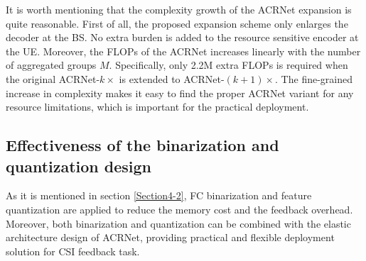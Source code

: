 \documentclass[12pt, draftclsnofoot, onecolumn]{IEEEtran}
\begin{document}
It is worth mentioning that the complexity growth of the ACRNet expansion is quite reasonable. First of all, the proposed expansion scheme only enlarges the decoder at the BS. No extra burden is added to the resource sensitive encoder at the UE. Moreover, the FLOPs of the ACRNet increases linearly with the number of aggregated groups $M$. Specifically, only 2.2M extra FLOPs is required when the original ACRNet-$k\times$ is extended to ACRNet-$(k+1)\times$. The fine-grained increase in complexity makes it easy to find the proper ACRNet variant for any resource limitations, which is important for the practical deployment.


\subsection{Effectiveness of the binarization and quantization design} \label{Section5-5}

As it is mentioned in section \ref{Section4-2}, FC binarization and feature quantization are applied to reduce the memory cost and the feedback overhead. Moreover, both binarization and quantization can be combined with the elastic architecture design of ACRNet, providing practical and flexible deployment solution for CSI feedback task.
\end{document}

